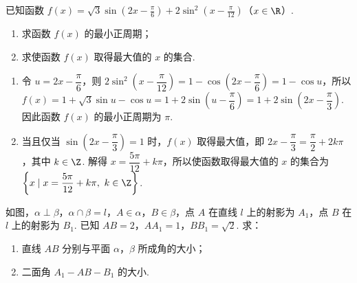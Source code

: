 \begin{problem}
已知函数 \( f(x) = \sqrt{3}\sin \left(2x - \frac{\pi}{6}\right) + 2\sin^2\left(x - \frac{\pi}{12}\right) \)（\(x \in \R\)）.

\begin{enumerate}
\item 求函数 \( f(x) \) 的最小正周期；
\item 求使函数 \( f(x) \) 取得最大值的 \(x\) 的集合.
\end{enumerate}
\end{problem}

\begin{solution}
\begin{enumerate}
\item 令 \(u=2x-\dfrac{\pi}{6}\)，则 \(2\sin^{2}\left(x-\dfrac{\pi}{12}\right)=1-\cos\left(2x-\dfrac{\pi}{6}\right)=1-\cos u\)，所以 \(f(x)=1+\sqrt{3}\sin u-\cos u=1+2\sin\left(u-\dfrac{\pi}{6}\right)=1+2\sin\left(2x-\dfrac{\pi}{3}\right)\). 因此函数 \(f(x)\) 的最小正周期为 \(\pi\).
\item 当且仅当 \(\sin\left(2x-\dfrac{\pi}{3}\right)=1\) 时，\(f(x)\) 取得最大值，即 \(2x-\dfrac{\pi}{3}=\dfrac{\pi}{2}+2k\pi\)，其中 \(k\in\Z\). 解得 \(x=\dfrac{5\pi}{12}+k\pi\)，所以使函数取得最大值的 \(x\) 的集合为 \(\left\{x\mid x=\dfrac{5\pi}{12}+k\pi,\ k\in\Z\right\}\).
\end{enumerate}
\end{solution}

\begin{problem}
如图，\(\alpha \perp \beta\)，\(\alpha \cap \beta = l\)，\(A \in \alpha\)，\(B \in \beta\)，点 \(A\) 在直线 \(l\) 上的射影为 \(A_1\)，点 \(B\) 在 \(l\) 上的射影为 \(B_1\). 已知 \(AB = 2\)，\(AA_1 = 1\)，\(BB_1 = \sqrt{2}\). 求：

\begin{enumerate}
\item 直线 \(AB\) 分别与平面 \(\alpha\)，\(\beta\) 所成角的大小；
\item 二面角 \(A_{1} - AB - B_{1}\) 的大小.
\end{enumerate}

\end{problem}

